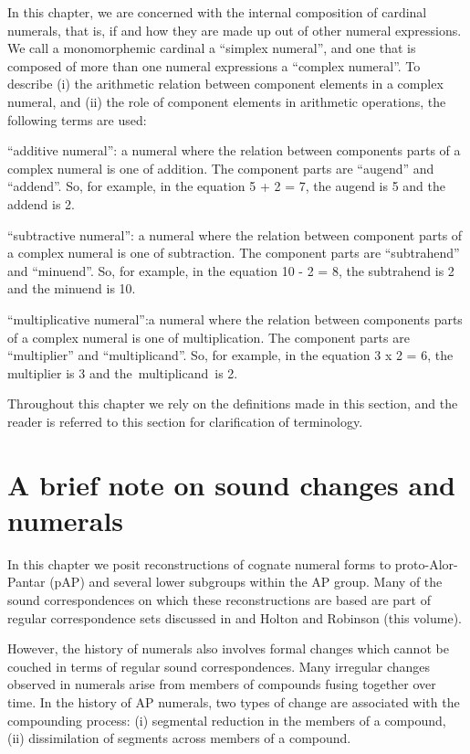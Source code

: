 In this chapter, we are concerned with the internal composition of cardinal numerals, that is, if and how they are made up out of other numeral expressions. We call a monomorphemic cardinal a ``simplex numeral'', and one that is composed of more than one numeral expressions a ``complex numeral''. To describe (i) the arithmetic relation between component elements in a complex numeral, and (ii) the role of component elements in arithmetic operations, the following terms are used:

``additive numeral'': a numeral where the relation between components parts of a complex numeral is one of addition. The component parts are ``augend'' and ``addend''.  So, for example, in the equation 5 + 2 = 7, the augend is 5 and the addend is 2.

``subtractive numeral'': a numeral where the relation between component parts of a complex numeral is one of subtraction. The component parts are ``subtrahend'' and ``minuend''. So, for example, in the equation 10 - 2 = 8, the subtrahend is 2 and the minuend is 10.

``multiplicative numeral'':a numeral where the relation between components parts of a complex numeral is one of multiplication. The component parts are ``multiplier'' and ``multiplicand''.  So, for example, in the equation 3 x 2 = 6, the multiplier is 3 and the~multiplicand~is 2. 

Throughout this chapter we rely on the definitions made in this section, and the reader is referred to this section for clarification of terminology.

\section{A brief note on sound changes and numerals}\label{sec:6:3}
In this chapter we posit reconstructions of cognate numeral forms to proto-Alor-Pantar (pAP) and several lower subgroups within the AP group. Many of the sound correspondences on which these reconstructions are based are part of regular correspondence sets discussed in \citet{HoltonEtAl2012} and Holton and Robinson (this volume). 

  However, the history of numerals also involves formal changes which cannot be couched in terms of regular sound correspondences. Many irregular changes observed in numerals arise from members of compounds fusing together over time. In the history of AP numerals, two  types of change are associated with the compounding process: (i) segmental reduction in the members of a compound, (ii) dissimilation of segments across members of a compound. 

